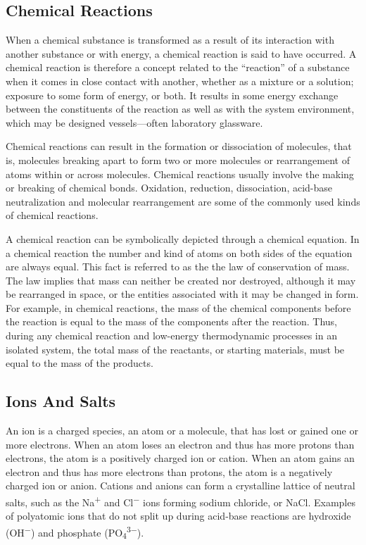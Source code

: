 \documentclass[
]{article}
\begin{document}
\hypertarget{chemical-reactions}{%
\subsection{Chemical Reactions}\label{chemical-reactions}}

When a chemical substance is transformed as a result of its interaction
with another substance or with energy, a chemical reaction is said to
have occurred. A chemical reaction is therefore a concept related to the
``reaction'' of a substance when it comes in close contact with another,
whether as a mixture or a solution; exposure to some form of energy, or
both. It results in some energy exchange between the constituents of the
reaction as well as with the system environment, which may be designed
vessels---often laboratory glassware.

Chemical reactions can result in the formation or dissociation of
molecules, that is, molecules breaking apart to form two or more
molecules or rearrangement of atoms within or across molecules. Chemical
reactions usually involve the making or breaking of chemical bonds.
Oxidation, reduction, dissociation, acid-base neutralization and
molecular rearrangement are some of the commonly used kinds of chemical
reactions.

A chemical reaction can be symbolically depicted through a chemical
equation. In a chemical reaction the number and kind of atoms on both
sides of the equation are always equal. This fact is referred to as the
the law of conservation of mass. The law implies that mass can neither
be created nor destroyed, although it may be rearranged in space, or the
entities associated with it may be changed in form. For example, in
chemical reactions, the mass of the chemical components before the
reaction is equal to the mass of the components after the reaction.
Thus, during any chemical reaction and low-energy thermodynamic
processes in an isolated system, the total mass of the reactants, or
starting materials, must be equal to the mass of the products.

\hypertarget{ions-and-salts}{%
\subsection{Ions And Salts}\label{ions-and-salts}}

An ion is a charged species, an atom or a molecule, that has lost or
gained one or more electrons. When an atom loses an electron and thus
has more protons than electrons, the atom is a positively charged ion or
cation. When an atom gains an electron and thus has more electrons than
protons, the atom is a negatively charged ion or anion. Cations and
anions can form a crystalline lattice of neutral salts, such as the
Na\textsuperscript{+} and Cl\textsuperscript{−} ions forming sodium
chloride, or NaCl. Examples of polyatomic ions that do not split up
during acid-base reactions are hydroxide (OH\textsuperscript{−}) and
phosphate (PO\textsubscript{4}\textsuperscript{3−}).
\end{document}
